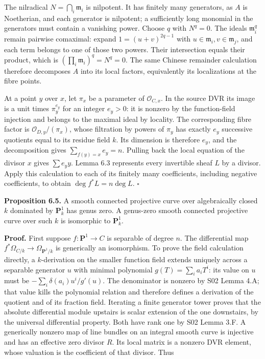 \documentclass[11pt,a4paper,openany]{report}
\begin{document}
The nilradical \(N=\bigcap_i\mathfrak m_i\) is nilpotent. It has finitely many generators, as \(A\) is Noetherian, and each generator is nilpotent; a sufficiently long monomial in the generators must contain a vanishing power. Choose \(q\) with \(N^q=0\). The ideals \(\mathfrak m_i^q\) remain pairwise comaximal: expand \(1=(u+v)^{2q-1}\) with \(u\in\mathfrak m_i,v\in\mathfrak m_j\), and each term belongs to one of those two powers. Their intersection equals their product, which is \((\prod_i\mathfrak m_i)^q=N^q=0\). The same Chinese remainder calculation therefore decomposes \(A\) into its local factors, equivalently its localizations at the fibre points.

At a point \(y\) over \(x\), let \(\pi_x\) be a parameter of \(\mathcal O_{C,x}\). In the source DVR its image is a unit times \(\pi_y^{e_y}\) for an integer \(e_y>0\): it is nonzero by the function-field injection and belongs to the maximal ideal by locality. The corresponding fibre factor is \(\mathcal O_{D,y}/(\pi_x)\), whose filtration by powers of \(\pi_y\) has exactly \(e_y\) successive quotients equal to its residue field \(k\). Its dimension is therefore \(e_y\), and the decomposition gives \(\sum_{f(y)=x}e_y=n\). Pulling back the local equation of the divisor \(x\) gives \(\sum e_y y\). Lemma 6.3 represents every invertible sheaf \(L\) by a divisor. Apply this calculation to each of its finitely many coefficients, including negative coefficients, to obtain \(\deg f^*L=n\deg L\). \(\square\)

\textbf{Proposition 6.5.} A smooth connected projective curve over algebraically closed \(k\) dominated by \(\mathbf P^1_k\) has genus zero. A genus-zero smooth connected projective curve over such \(k\) is isomorphic to \(\mathbf P^1_k\).

\textbf{Proof.} First suppose \(f:\mathbf P^1\to C\) is separable of degree \(n\). The differential map \(f^*\Omega_{C/k}\to\Omega_{\mathbf P^1/k}\) is generically an isomorphism. To prove the field calculation directly, a \(k\)-derivation on the smaller function field extends uniquely across a separable generator \(u\) with minimal polynomial \(g(T)=\sum_i a_iT^i\): its value on \(u\) must be \(-\sum_i\delta(a_i)u^i/g'(u)\). The denominator is nonzero by S02 Lemma 4.A; that value kills the polynomial relation and therefore defines a derivation of the quotient and of its fraction field. Iterating a finite generator tower proves that the absolute differential module upstairs is scalar extension of the one downstairs, by the universal differential property. Both have rank one by S02 Lemma 3.F. A generically nonzero map of line bundles on an integral smooth curve is injective and has an effective zero divisor \(R\). Its local matrix is a nonzero DVR element, whose valuation is the coefficient of that divisor. Thus
\end{document}
